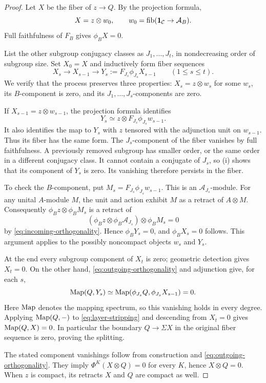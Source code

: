 \begin{proof}
Let \(X\) be the fiber of \(z\to Q\). By the projection formula,
\[
 X=z\otimes w_0,\qquad
 w_0=\operatorname{fib}(\mathbf1_{\mathcal C}\to \mathcal A_B).
\]
Full faithfulness of \(F_B\) gives \(\phi_BX=0\).

List the other subgroup conjugacy classes as \(J_1,\ldots,J_t\), in
nondecreasing order of subgroup size. Set \(X_0=X\) and inductively form
fiber sequences
\begin{equation}\label{eq:layer-stripping}
 X_s\longrightarrow X_{s-1}\longrightarrow
 Y_s:=F_{J_s}\phi_{J_s}X_{s-1}
 \qquad(1\le s\le t).
\end{equation}
We verify that the process preserves three properties:
\(X_s=z\otimes w_s\) for some \(w_s\), its \(B\)-component is zero,
and its \(J_1,\ldots,J_s\)-components are zero.

If \(X_{s-1}=z\otimes w_{s-1}\), the projection formula identifies
\[
 Y_s\simeq z\otimes F_{J_s}\phi_{J_s}w_{s-1}.
\]
It also identifies the map to \(Y_s\) with \(z\) tensored with the
adjunction unit on \(w_{s-1}\). Thus its fiber has the same form.
The \(J_s\)-component of the fiber vanishes by full faithfulness.
A previously removed subgroup has smaller order, or the same order in a
different conjugacy class. It cannot contain a conjugate of \(J_s\), so
\textup{(i)} shows that its component of
\(Y_s\) is zero. Its vanishing therefore persists in the fiber.

To check the \(B\)-component, put
\(M_s=F_{J_s}\phi_{J_s}w_{s-1}\). This is an \(\mathcal A_{J_s}\)-module.
For any unital \(A\)-module \(M\), the unit and action exhibit
\(M\) as a retract of \(A\otimes M\). Consequently
\(\phi_Bz\otimes\phi_BM_s\) is a retract of
\[
 (\phi_Bz\otimes\phi_B\mathcal A_{J_s})\otimes\phi_BM_s=0
\]
by \eqref{eq:incoming-orthogonality}. Hence \(\phi_BY_s=0\), and
\(\phi_BX_s=0\) follows. This argument applies to the possibly
noncompact objects \(w_s\) and \(Y_s\).

At the end every subgroup component of \(X_t\) is zero; geometric
detection gives \(X_t=0\). On the other hand,
\eqref{eq:outgoing-orthogonality} and adjunction give, for each \(s\),
\[
 \operatorname{Map}(Q,Y_s)
 \simeq\operatorname{Map}(\phi_{J_s}Q,\phi_{J_s}X_{s-1})=0.
\]
Here \(\operatorname{Map}\) denotes the mapping spectrum, so this vanishing holds in
every degree. Applying \(\operatorname{Map}(Q,-)\) to
\eqref{eq:layer-stripping} and descending from \(X_t=0\) gives
\(\operatorname{Map}(Q,X)=0\). In particular the boundary \(Q\to\Sigma X\)
in the original fiber sequence is zero, proving the splitting.

The stated component vanishings follow from construction and
\eqref{eq:outgoing-orthogonality}. They imply
\(\Phi^K(X\otimes Q)=0\) for every \(K\), hence \(X\otimes Q=0\).
When \(z\) is compact, its retracts \(X\) and \(Q\) are compact as well.
\end{proof}

